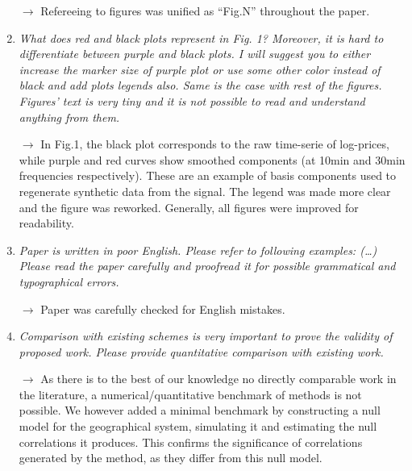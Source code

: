 \documentclass[11pt,a4paper,sans]{moderncv}        %
\begin{document}
\begin{enumerate}
	$\rightarrow$ Refereeing to figures was unified as ``Fig.N'' throughout the paper.
	
	\medskip
	
	\item \textit{What does red and black plots represent in Fig. 1? Moreover, it is hard to differentiate between purple and black plots. I will suggest you to either increase the marker size of purple plot or use some other color instead of black and add plots legends also. Same is the case with rest of the figures. Figures’ text is very tiny and it is not possible to read and understand anything from them.}

	$\rightarrow$ In Fig.1, the black plot corresponds to the raw time-serie of log-prices, while purple and red curves show smoothed components (at 10min and 30min frequencies respectively). These are an example of basis components used to regenerate synthetic data from the signal. The legend was made more clear and the figure was reworked. Generally, all figures were improved for readability.
	
	\medskip
	
	\item \textit{Paper is written in poor English. Please refer to following examples: (\ldots) Please read the paper carefully and proofread it for possible grammatical and typographical errors.} 

	$\rightarrow$ Paper was carefully checked for English mistakes.

	\medskip

	\item \textit{Comparison with existing schemes is very important to prove the validity of proposed work. Please provide quantitative comparison with existing work.}
  
  	$\rightarrow$ As there is to the best of our knowledge no directly comparable work in the literature, a numerical/quantitative benchmark of methods is not possible. We however added a minimal benchmark by constructing a null model for the geographical system, simulating it and estimating the null correlations it produces. This confirms the significance of correlations generated by the method, as they differ from this null model.
  	
\end{enumerate}
\end{document}
